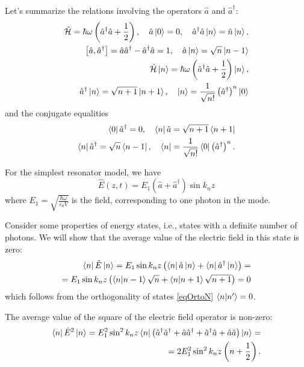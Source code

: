 Let's summarize the relations involving the operators $\hat{a}$ and $\hat{a}^{\dag}$:
\begin{eqnarray}
\hat{\mathcal{H}} = \hbar \omega \left(\hat{a}^{\dag}\hat{a} +
\frac{1}{2} \right),
\quad
\hat{a}\ket{0} = 0,
\quad
\hat{a}^{\dag}\hat{a}\ket{n} = \hat{n}\ket{n},
\nonumber \\
\left[\hat{a}, \hat{a}^{\dag}\right] = \hat{a} \hat{a}^{\dag} - \hat{a}^{\dag}
\hat{a} = 1,
\quad
\hat{a}\ket{n} = \sqrt{n}\ket{n - 1}
\nonumber \\
\hat{\mathcal{H}}\ket{n} = \hbar \omega \left(\hat{a}^{\dag}\hat{a} +
\frac{1}{2} \right)\ket{n},
\nonumber \\
\hat{a}^{\dag}\ket{n} = \sqrt{n + 1}\ket{n + 1},
\quad
\ket{n} = \frac{1}{\sqrt{n!}}\left(\hat{a}^{\dag}\right)^n\ket{0}
\end{eqnarray}
and the conjugate equalities
\begin{eqnarray}
\bra{0}\hat{a}^{\dag} = 0,
\quad
\bra{n}\hat{a} = \sqrt{n + 1}\bra{n + 1}
\nonumber \\
\bra{n}\hat{a}^{\dag} = \sqrt{n}\bra{n - 1},
\quad
\bra{n} =  \frac{1}{\sqrt{n!}} \bra{0}\left(\hat{a}^{\dag}\right)^n.
\end{eqnarray}

For the simplest resonator model, we have
\[
\hat{E}\left(z, t\right) = E_1\left( \hat{a} +
\hat{a}^{\dag}\right) \sin k_n z
\]
where $E_1 = \sqrt{\frac{\hbar \omega}{\varepsilon_0 V}}$ is the field,
corresponding to one photon in the mode.  

Consider some properties of energy states, i.e., states
with a definite number of photons. We will show that the average
value of the electric field in this state is zero: 
\begin{eqnarray}
\bra{n}\hat{E}\ket{n} = 
E_1 \sin k_n z \left( \bra{n}\hat{a}\ket{n} +
\bra{n}\hat{a}^{\dag}\ket{n}\right) =
\nonumber \\
= E_1 \sin k_n z \left( \bra{n}\ket{n - 1} \sqrt{n} +
\bra{n}\ket{n + 1} \sqrt{n + 1}
\right) = 0
\label{eqCh1_E_middle}
\end{eqnarray}
which follows from the orthogonality of states \eqref{eqOrtoN}
$\bra{n}\ket{n'} = 0$.

The average value of the square of the electric field operator is non-zero:
\begin{eqnarray}
\bra{n}\hat{E}^2\ket{n} = 
E_1^2 \sin^2 k_n z \bra{n}
\left(
\hat{a}^{\dag} \hat{a}^{\dag} + \hat{a} \hat{a}^{\dag} + \hat{a}^{\dag} \hat{a} +
\hat{a} \hat{a}
\right)
\ket{n} =
\nonumber \\
= 2 E_1^2 \sin^2 k_n z \left( n + \frac{1}{2}
\right).
\label{eqCh1_E2_middle}
\end{eqnarray}

